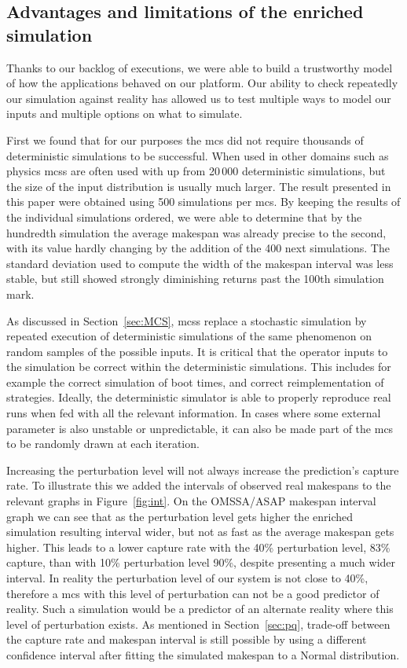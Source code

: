 \documentclass[10pt,conference,compsocconf]{IEEEtran}
\begin{document}
\subsection{Advantages and limitations of the enriched simulation}\label{sec:lim}

Thanks to our backlog of executions, we were able to build a trustworthy model
of how the applications behaved on our platform. Our ability to check repeatedly
our simulation against reality has allowed us to test multiple ways to model 
our inputs and multiple options on what to simulate. 

First we found that  for our purposes the \ac{mcs} did  not require thousands of
deterministic simulations to  be successful. When used in other  domains such as
physics \acp{mcs} are often used with up from 20\,000 deterministic simulations,
but  the size  of the  input  distribution is  usually much  larger. The  result
presented  in this  paper were obtained using  500 simulations per \ac{mcs}.  By
keeping  the results  of the  individual simulations  ordered, we  were able  to
determine  that by  the hundredth  simulation the  average makespan  was already
precise to the second, with its value hardly changing by the addition of the 400
next  simulations. The  standard  deviation used  to compute  the  width of  the
makespan interval was less stable, but still showed strongly diminishing returns
past the 100th simulation mark.

As discussed in Section~\ref{sec:MCS}, \aclp{mcs} replace a stochastic
simulation by repeated execution of deterministic simulations of the same
phenomenon on random samples of the possible inputs. It is critical that the
operator inputs to the simulation be correct within the deterministic simulations.
This includes for example the correct simulation of boot times, and correct
reimplementation of strategies. Ideally, the deterministic simulator is able to
properly reproduce real runs when fed with all the relevant information. In cases
where some external parameter is also unstable or unpredictable, it can also be
made part of the \ac{mcs} to be randomly drawn at each iteration.

Increasing the perturbation level will not always increase the prediction's
capture rate. To illustrate this we added the intervals of observed real
makespans to the relevant graphs in Figure~\ref{fig:int}. On the OMSSA/ASAP
makespan interval graph we can see that as the perturbation level gets higher
the enriched simulation resulting interval wider, but not as fast as the
average makespan gets higher. This leads to a lower capture rate with the 40\%
perturbation level, 83\% capture, than with 10\% perturbation level 90\%,
despite presenting a much wider interval. In reality the perturbation level of
our system is not close to 40\%, therefore a \ac{mcs} with this level of
perturbation can not be a good predictor of reality. Such a simulation would be
a predictor of an alternate reality where this level of perturbation exists. As
mentioned in Section~\ref{sec:pq}, trade-off between the capture rate and
makespan interval is still possible by using a different confidence
interval after fitting the simulated makespan to a Normal distribution.
\end{document}
